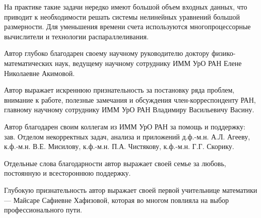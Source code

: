 \intro

%
%

\actualitysection
\actualitytext

На практике такие задачи нередко имеют большой объем входных данных, что приводит к необходимости решать системы нелинейных уравнений большой размерности. Для уменьшения времени счета используются многопроцессорные вычислители и технологии распараллеливания.


\developmentsection
\developmenttext

\objectivesection
\objectivetext

\methodssection
\methodstext

\noveltysection
\noveltytext

{}


\approbationsection
\approbationtext

\pubsection
\pubtext

\contribsection
\contribtext

\structsection
\structtext

Автор глубоко благодарен своему научному руководителю доктору физико-математических наук, ведущему научному сотруднику ИММ УрО РАН Елене Николаевне Акимовой.

Автор выражает искреннюю признательность за постановку ряда проблем, внимание к работе, полезные замечания и обсуждения член-корреспонденту РАН, главному научному сотруднику ИММ УрО РАН Владимиру Васильевичу Васину.

Автор благодарен своим коллегам из ИММ УрО РАН за помощь и поддержку: зав. Отделом некорректных задач, анализа и приложений д.ф.-м.н. А.Л. Агееву, к.ф.-м.н. В.Е. Мисилову, к.ф.-м.н. П.А. Чистякову, к.ф.-м.н. Г.Г. Скорику.

Отдельные слова благодарности автор выражает своей семье за любовь, постоянную и всестороннюю поддержку.

Глубокую признательность автор выражает своей первой учительнице математики --- Майсаре Сафиевне Хафизовой, которая во многом повлияла на выбор профессионального пути.


